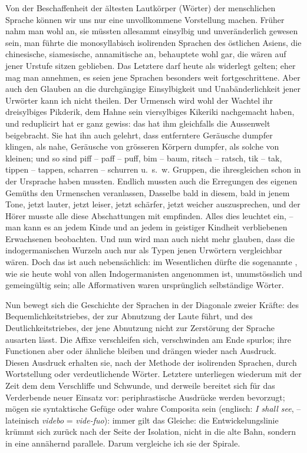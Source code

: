 {Von der Beschaffenheit der ältesten Lautkörper (Wörter) der menschlichen Sprache können wir uns nur eine unvollkommene Vorstellung machen. Früher nahm man wohl an, sie müssten allesammt einsylbig und unveränderlich gewesen sein, man führte die monosyllabisch isolirenden Sprachen des östlichen Asiens, die chinesische, siamesische, annamitische an, behauptete wohl gar, die wären auf jener Urstufe sitzen geblieben. Das Letztere darf heute als widerlegt gelten; eher mag man annehmen, es seien jene Sprachen besonders weit fortgeschrittene. Aber auch den Glauben an die durchgängige Einsylbigkeit und Unabänderlichkeit jener Urwörter kann ich nicht theilen. Der Urmensch wird wohl der Wachtel ihr dreisylbiges Pikderik, dem Hahne sein viersylbiges Kikeriki nachgemacht haben, und reduplicirt hat er ganz gewiss: das hat ihm gleichfalls die Aussenwelt beigebracht. Sie hat ihn auch gelehrt, dass entferntere Geräusche dumpfer klingen, als nahe, Geräusche von grösseren Körpern dumpfer, als solche von kleinen; und so sind piff – paff – puff, bim – baum, ritsch – ratsch, tik – tak, tippen – tappen, scharren – schurren u.~s.~w. Gruppen, die ihresgleichen schon in der Ursprache haben mussten. Endlich mussten auch die Erregungen des eigenen Gemüths den Urmenschen veranlassen, Dasselbe bald in diesem, bald in jenem Tone, jetzt lauter, jetzt leiser, jetzt schärfer, jetzt weicher auszusprechen, und der Hörer musste alle diese Abschattungen mit empfinden. Alles dies leuchtet ein, – man kann es an jedem Kinde und an jedem \label{sp.256} in geistiger Kindheit verbliebenen Erwachsenen beobachten. Und nun wird man auch nicht mehr glauben, dass die indo\-\label{fp.251}germanischen Wurzeln auch nur als Typen jenen Urwörtern vergleichbar wären. Doch das ist auch nebensächlich: im Wesentlichen dürfte die sogenannte , wie sie heute wohl von allen Indogermanisten angenommen ist, unumstösslich und gemeingültig sein; alle Afformativen waren ursprünglich selbständige Wörter.

Nun bewegt sich die Geschichte der Sprachen in der Diagonale zweier Kräfte: des Bequemlichkeitstriebes, der zur Abnutzung der Laute führt, und des Deutlichkeitstriebes, der jene Abnutzung nicht zur Zerstörung der Sprache ausarten lässt. Die Affixe verschleifen sich, verschwinden am Ende spurlos; ihre Functionen aber oder ähnliche bleiben und drängen wieder nach Ausdruck. Diesen Ausdruck erhalten sie, nach der Methode der isolirenden Sprachen, durch Wortstellung oder  verdeutlichende Wörter. Letztere unterliegen wiederum mit der Zeit dem  dem Verschliffe und Schwunde, und derweile bereitet sich für das Verderbende neuer Einsatz vor: periphrastische Ausdrücke werden bevorzugt; mögen sie syntaktische Gefüge oder wahre Composita sein (englisch: \textit{I shall see}, – lateinisch \textit{videbo} = \textit{vide-fuo}): immer gilt das Gleiche: die Entwickelungslinie krümmt sich zurück nach der Seite der Isolation, nicht in die alte Bahn, sondern in eine annähernd parallele. Darum vergleiche ich sie der Spirale.

}
